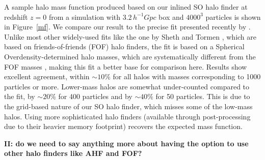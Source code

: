 A sample halo mass function produced based on our inlined SO halo finder 
at redshift $z=0$ from a simulation with $3.2\,h^{-1}Gpc$ box and $4000^3$
particles is shown in Figure~\ref{mf}. We compare our result to the 
precise fit presented recently by \citet{2008ApJ...688..709T}. Unlike most
other widely-used fits like the one by Sheth and Tormen 
\citep{2002MNRAS.329...61S}, which are based on friends-of-friends (FOF)
halo finders, the \citet{2008ApJ...688..709T} fit is based on a Spherical 
Overdensity-determined halo masses, which are systematically different 
from the FOF masses \citep[e.g.][]{2007MNRAS.374....2R,2008ApJ...688..709T}, 
making this fit a better base for comparison here. Results show excellent
agreement, within $\sim10\%$ for all halos with masses corresponding to
1000 particles or more. Lower-mass halos are somewhat under-counted compared
to the \citet{2008ApJ...688..709T} fit, by $\sim20\%$ for 400 particles and 
by $\sim40\%$ for 50 particles. This is due to the grid-based nature of our
SO halo finder, which misses some of the low-mass halos. Using more sophisticated
halo finders (available through post-processing due to their heavier memory
footprint) recovers the expected mass function.



{\bf II: do we need to say anything more about having the option to use other
halo finders like AHF and FOF?}

